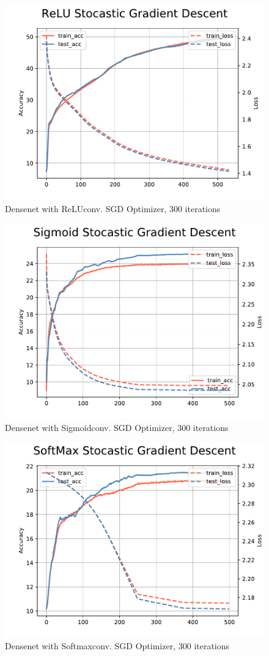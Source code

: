 \documentclass{article}
\begin{document}
\begin{figure}
        \centering
        \includegraphics[width=0.8\linewidth]{figures/SGD3k/relu.pdf}
        \caption{Densenet with ReLUconv. SGD Optimizer, 300 iterations}
\end{figure}

\begin{figure}
        \centering
        \includegraphics[width=0.8\linewidth]{figures/SGD3k/sigmoid.pdf}
        \caption{Densenet with Sigmoidconv. SGD Optimizer, 300 iterations}
\end{figure}

\begin{figure}
        \centering
        \includegraphics[width=0.8\linewidth]{figures/SGD3k/softmax.pdf}
        \caption{Densenet with Softmaxconv. SGD Optimizer, 300 iterations}
\end{figure}
\end{document}
